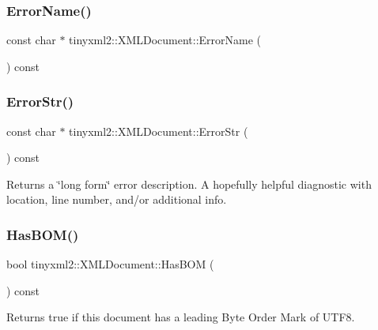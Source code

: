\subsubsection{\texorpdfstring{Error\+Name()}{ErrorName()}}
{\footnotesize\ttfamily const char $\ast$ tinyxml2\+::\+X\+M\+L\+Document\+::\+Error\+Name (\begin{DoxyParamCaption}{ }\end{DoxyParamCaption}) const}

\mbox{\label{classtinyxml2_1_1_x_m_l_document_ae97fff2402a0d01e0509c430b37996b3}} 
\subsubsection{\texorpdfstring{Error\+Str()}{ErrorStr()}}
{\footnotesize\ttfamily const char $\ast$ tinyxml2\+::\+X\+M\+L\+Document\+::\+Error\+Str (\begin{DoxyParamCaption}{ }\end{DoxyParamCaption}) const}

Returns a \char`\"{}long form\char`\"{} error description. A hopefully helpful diagnostic with location, line number, and/or additional info. \mbox{\label{classtinyxml2_1_1_x_m_l_document_a33fc5d159db873a179fa26338adb05bd}} 
\subsubsection{\texorpdfstring{Has\+B\+O\+M()}{HasBOM()}}
{\footnotesize\ttfamily bool tinyxml2\+::\+X\+M\+L\+Document\+::\+Has\+B\+OM (\begin{DoxyParamCaption}{ }\end{DoxyParamCaption}) const\hspace{0.3cm}{\ttfamily [inline]}}

Returns true if this document has a leading Byte Order Mark of U\+T\+F8. \mbox{\label{classtinyxml2_1_1_x_m_l_document_a25827d1bec509ad566a107e5853ed040}} 
